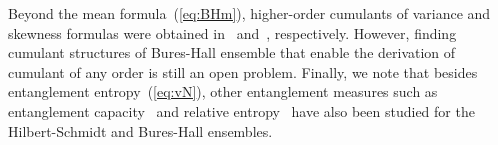 \documentclass[pdflatex,sn-mathphys-num]{sn-jnl}%
\theoremstyle{thmstyleone}
\begin{document}
\begin{appendices}
Beyond the mean formula~(\ref{eq:BHm}), higher-order cumulants of variance and skewness formulas were obtained in~\cite{Wei20BH} and~\cite{WHW25}, respectively. However, finding cumulant structures of Bures-Hall ensemble that enable the derivation of cumulant of any order is still an open problem. Finally, we note that besides entanglement entropy~(\ref{eq:vN}), other entanglement measures such as entanglement capacity~\cite{Wei23} and relative entropy~\cite{Wei26} have also been studied for the Hilbert-Schmidt and Bures-Hall ensembles.
\end{appendices}\\


\end{document}
